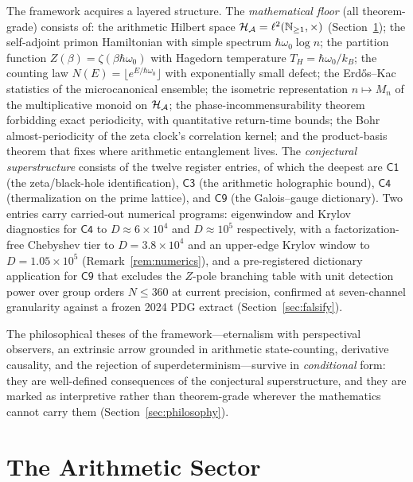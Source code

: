 The framework acquires a layered structure. The \emph{mathematical floor} (all theorem-grade)
consists of: the arithmetic Hilbert space $\mathcal{H}_{\mathcal{A}}=\ell^{2}(\mathbb{N}_{\geq1},\times)$
(Section~\ref{sec:arithmetic}); the self-adjoint primon Hamiltonian with simple spectrum
$\hbar\omega_{0}\log n$; the partition function $Z(\beta)=\zeta(\beta\hbar\omega_{0})$ with
Hagedorn temperature $T_{H}=\hbar\omega_{0}/k_{B}$; the counting law
$N(E)=\lfloor e^{E/\hbar\omega_{0}}\rfloor$ with exponentially small defect; the Erd\H{o}s--Kac
statistics of the microcanonical ensemble; the isometric representation $n\mapsto M_{n}$ of
the multiplicative monoid on $\mathcal{H}_{\mathcal{A}}$; the phase-incommensurability theorem forbidding
exact periodicity, with quantitative return-time bounds; the Bohr almost-periodicity of the
zeta clock's correlation kernel; and the product-basis theorem that fixes where arithmetic
entanglement lives. The \emph{conjectural superstructure} consists of the
twelve register entries, of which the deepest are $\mathsf{C1}$ (the zeta/black-hole
identification), $\mathsf{C3}$ (the arithmetic holographic bound), $\mathsf{C4}$ (thermalization
on the prime lattice), and $\mathsf{C9}$ (the Galois--gauge dictionary). Two entries carry
carried-out numerical programs: eigenwindow and Krylov diagnostics for $\mathsf{C4}$ to
$D\approx6\times10^{4}$ and $D\approx10^{5}$ respectively, with a factorization-free
Chebyshev tier to $D=3.8\times10^{4}$ and an upper-edge Krylov window to
$D=1.05\times10^{5}$ (Remark~\ref{rem:numerics}), and a
pre-registered dictionary application for $\mathsf{C9}$ that excludes the $Z$-pole branching table
with unit detection power over group orders $N\leq360$ at current precision, confirmed at
seven-channel granularity against a frozen 2024 PDG extract (Section~\ref{sec:falsify}).

The philosophical theses of the framework---eternalism with perspectival observers, an extrinsic
arrow grounded in arithmetic state-counting, derivative causality, and the rejection of
superdeterminism---survive in \emph{conditional} form: they are well-defined consequences of the
conjectural superstructure, and they are marked as interpretive rather than theorem-grade
wherever the mathematics cannot carry them (Section~\ref{sec:philosophy}).

\section{The Arithmetic Sector}\label{sec:arithmetic}


